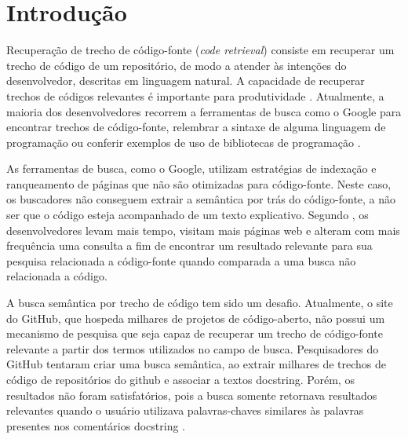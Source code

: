 \chapter{Introdução}
\label{cap:introducao}


Recuperação de trecho de código-fonte (\textit{code retrieval}) consiste em recuperar um trecho de código de um repositório, de modo a atender às intenções do desenvolvedor, descritas em linguagem natural. A capacidade de recuperar trechos de códigos relevantes é importante para produtividade \citep{sadowski-how-developers-search-for-code-case-study:2015}. Atualmente, a maioria dos desenvolvedores recorrem a ferramentas de busca como o Google para encontrar trechos de código-fonte, relembrar a sintaxe de alguma linguagem de programação ou conferir exemplos de uso de bibliotecas de programação \citep{masudur-developers-use-google-code-retrieval:2018}.

As ferramentas de busca, como o Google, utilizam estratégias de indexação e ranqueamento de páginas que não são otimizadas para código-fonte. Neste caso, os buscadores não conseguem extrair a semântica por trás do código-fonte, a não ser que o código esteja acompanhado de um texto explicativo. Segundo \cite{masudur-developers-use-google-code-retrieval:2018}, os desenvolvedores levam mais tempo, visitam mais páginas web e alteram com mais frequência uma consulta a fim de encontrar um resultado relevante para sua pesquisa relacionada a código-fonte quando comparada a uma busca não relacionada a código.


A busca semântica por trecho de código tem sido um desafio. Atualmente, o site do GitHub, que hospeda milhares de projetos de código-aberto, não possui um mecanismo de pesquisa que
seja capaz de recuperar um trecho de código-fonte relevante a partir dos termos utilizados no campo de busca. Pesquisadores do GitHub tentaram criar uma busca semântica, ao extrair milhares de trechos de código de repositórios do \Gls{github} e associar a textos \gls{docstring}. Porém, os resultados não foram satisfatórios, pois a busca somente retornava resultados relevantes quando o usuário utilizava palavras-chaves similares às palavras presentes nos comentários \gls{docstring} \citep{husain-github-semantic-search-code-2019}. 

